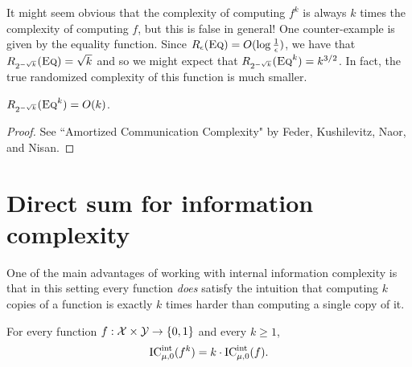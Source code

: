It might seem obvious that the complexity of computing $f^k$ is always $k$ times the complexity of computing $f$, but this is false in general! One counter-example is given by the equality function. Since $R_\epsilon(\textsc{Eq}) = O(\log \frac1\epsilon)$, we have that $R_{2^{-\sqrt{k}}}(\textsc{Eq}) = \sqrt{k}$ and so we might expect that $R_{2^{-\sqrt{k}}}(\textsc{Eq}^k) = k^{3/2}$. In fact, the true randomized complexity of this function is much smaller.

\begin{theorem}
$R_{2^{-\sqrt{k}}}(\textsc{Eq}^k) = O(k)$.
\end{theorem}

\begin{proof}
See ``Amortized Communication Complexity" by Feder, Kushilevitz, Naor, and Nisan.
\end{proof}


\newpage 
\section{Direct sum for information complexity}

One of the main advantages of working with internal information complexity is that in this setting every function \emph{does} satisfy the intuition that computing $k$ copies of a function is exactly $k$ times harder than computing a single copy of it.
\begin{theorem}\label{th:9}
For every function $f : \mathcal{X} \times \mathcal{Y} \to \{0,1\}$ and every $k \ge 1$,
\[
\mathrm{IC}^{\mathrm{int}}_{\mu,0}(f^k) = k \cdot \mathrm{IC}^{\mathrm{int}}_{\mu,0}(f).
\]
\end{theorem}

